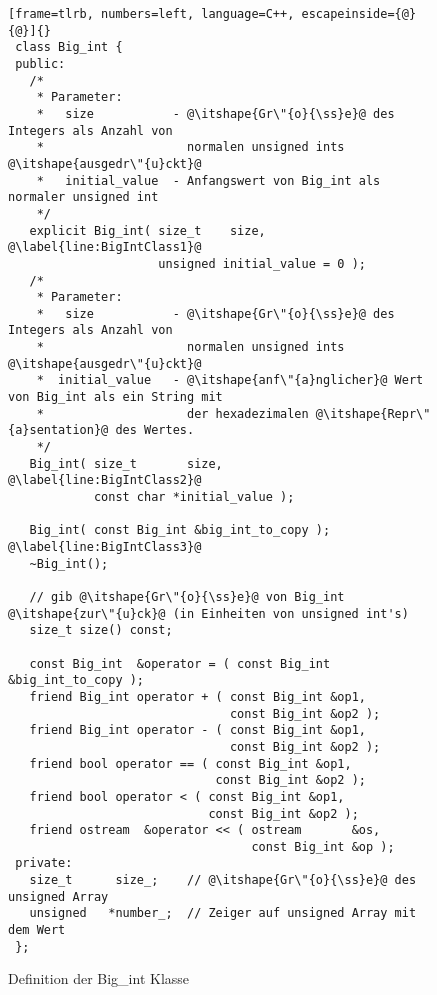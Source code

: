 \begin{figure}[tp]
\begin{lstlisting}[frame=tlrb, numbers=left, language=C++, escapeinside={@}{@}]{}
 class Big_int {
 public:
   /*
    * Parameter:
    *   size           - @\itshape{Gr\"{o}{\ss}e}@ des Integers als Anzahl von
    *                    normalen unsigned ints @\itshape{ausgedr\"{u}ckt}@
    *   initial_value  - Anfangswert von Big_int als normaler unsigned int
    */
   explicit Big_int( size_t    size,                @\label{line:BigIntClass1}@
                     unsigned initial_value = 0 );
   /*
    * Parameter:
    *   size           - @\itshape{Gr\"{o}{\ss}e}@ des Integers als Anzahl von
    *                    normalen unsigned ints @\itshape{ausgedr\"{u}ckt}@
    *  initial_value   - @\itshape{anf\"{a}nglicher}@ Wert von Big_int als ein String mit
    *                    der hexadezimalen @\itshape{Repr\"{a}sentation}@ des Wertes.
    */
   Big_int( size_t       size,                      @\label{line:BigIntClass2}@
            const char *initial_value );

   Big_int( const Big_int &big_int_to_copy );       @\label{line:BigIntClass3}@
   ~Big_int();

   // gib @\itshape{Gr\"{o}{\ss}e}@ von Big_int @\itshape{zur\"{u}ck}@ (in Einheiten von unsigned int's)
   size_t size() const;

   const Big_int  &operator = ( const Big_int &big_int_to_copy );
   friend Big_int operator + ( const Big_int &op1,
                               const Big_int &op2 );
   friend Big_int operator - ( const Big_int &op1,
                               const Big_int &op2 );
   friend bool operator == ( const Big_int &op1,
                             const Big_int &op2 );
   friend bool operator < ( const Big_int &op1,
                            const Big_int &op2 );
   friend ostream  &operator << ( ostream       &os,
                                  const Big_int &op );
 private:
   size_t      size_;    // @\itshape{Gr\"{o}{\ss}e}@ des unsigned Array
   unsigned   *number_;  // Zeiger auf unsigned Array mit dem Wert
 };
\end{lstlisting}
\caption{Definition der {\code Big\_int} Klasse\label{fig:BigIntClass}}
\end{figure}

